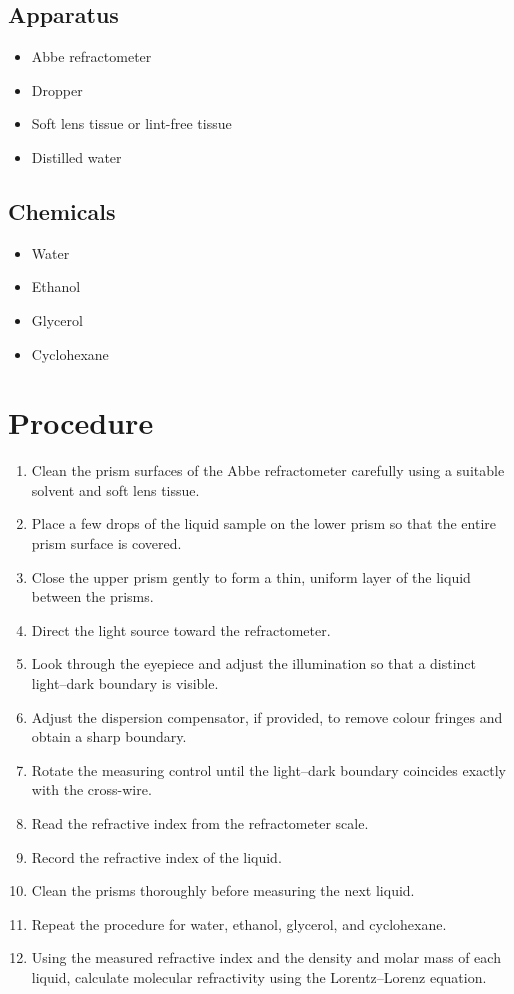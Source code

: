 \documentclass[12pt,a4paper]{article}
\begin{document}
\subsection*{Apparatus}
\begin{itemize}
    \item Abbe refractometer
    \item Dropper
    \item Soft lens tissue or lint-free tissue
    \item Distilled water
\end{itemize}

\subsection*{Chemicals}
\begin{itemize}
    \item Water
    \item Ethanol
    \item Glycerol
    \item Cyclohexane
\end{itemize}

\section*{Procedure}

\begin{enumerate}
    \item Clean the prism surfaces of the Abbe refractometer carefully using a suitable solvent and soft lens tissue.
    \item Place a few drops of the liquid sample on the lower prism so that the entire prism surface is covered.
    \item Close the upper prism gently to form a thin, uniform layer of the liquid between the prisms.
    \item Direct the light source toward the refractometer.
    \item Look through the eyepiece and adjust the illumination so that a distinct light--dark boundary is visible.
    \item Adjust the dispersion compensator, if provided, to remove colour fringes and obtain a sharp boundary.
    \item Rotate the measuring control until the light--dark boundary coincides exactly with the cross-wire.
    \item Read the refractive index from the refractometer scale.
    \item Record the refractive index of the liquid.
    \item Clean the prisms thoroughly before measuring the next liquid.
    \item Repeat the procedure for water, ethanol, glycerol, and cyclohexane.
    \item Using the measured refractive index and the density and molar mass of each liquid, calculate molecular refractivity using the Lorentz--Lorenz equation.
\end{enumerate}
\end{document}
